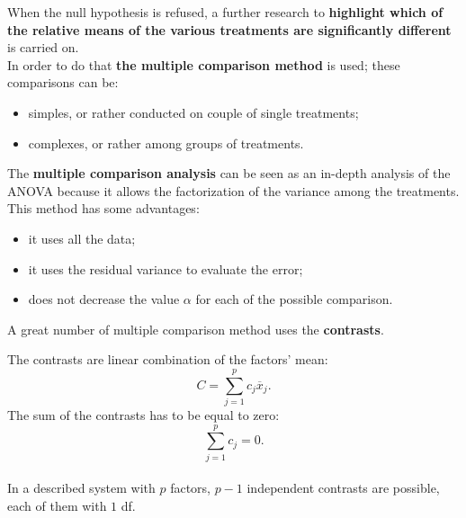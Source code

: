 
\begin{frame}
  \vspace*{.75cm}
  When the null hypothesis is refused, a further research to \textbf{highlight which of the relative means of the various treatments are significantly different} is carried on.\\
  \vspace*{.75cm}
  In order to do that \textbf{the multiple comparison method} is used; these comparisons can be:
  \begin{itemize}
    \item simples, or rather conducted on couple of single treatments;
    \item complexes, or rather among groups of treatments.
  \end{itemize}
\end{frame}

\begin{frame}
  \vspace*{.75cm}
  The \textbf{multiple comparison analysis} can be seen as an in-depth analysis of the ANOVA because it allows the factorization of the variance among the treatments. This method has some advantages:
  \vspace*{.50cm}
  \begin{itemize}
    \item it uses all the data;
    \item it uses the residual variance to evaluate the error;
    \item does not decrease the value {\boldmath $ \alpha $} for each of the possible comparison.
  \end{itemize}
  \vspace*{.75cm}
  A great number of multiple comparison method uses the \textbf{contrasts}.\\
\end{frame}

\begin{frame}
  \vspace*{.25cm}
  The contrasts are linear combination of the factors' mean:
  $$ C = \sum_{j=1}^p{c_j\overline{x}_j} \mbox{.} $$
  The sum of the contrasts has to be equal to zero:
  $$ \sum_{j=1}^p{c_j} = 0 \mbox{.} $$ \\
  \vspace*{.5cm}
  In a described system with $ p $ factors, $ p-1 $ independent contrasts are possible, each of them with $ 1 $ df.\\
\end{frame}


